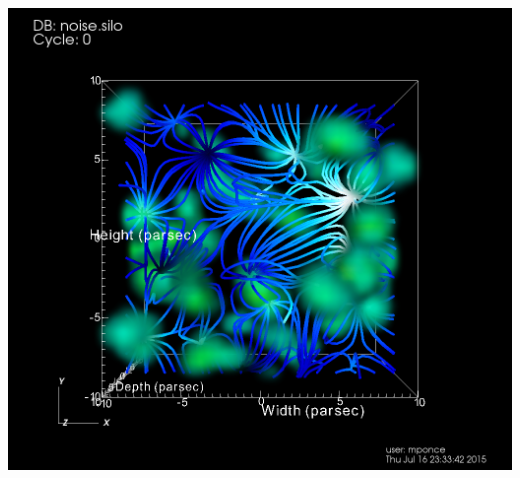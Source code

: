 \begin{frame}
\begin{columns}
\begin{column}{5.5cm}
\begin{beamerboxesrounded}[upper=block head,lower=block body,shadow=true]{}
	\hspace{3.5mm}
\end{beamerboxesrounded}

	\includegraphics[width=\columnwidth]{figs/visit-pract/VisIt_volRendering01a}
\end{column}
\end{columns}
\end{frame}



